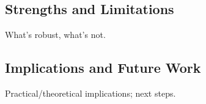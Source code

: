 \subsection{Strengths and Limitations}
What’s robust, what’s not.

\subsection{Implications and Future Work}
Practical/theoretical implications; next steps.




